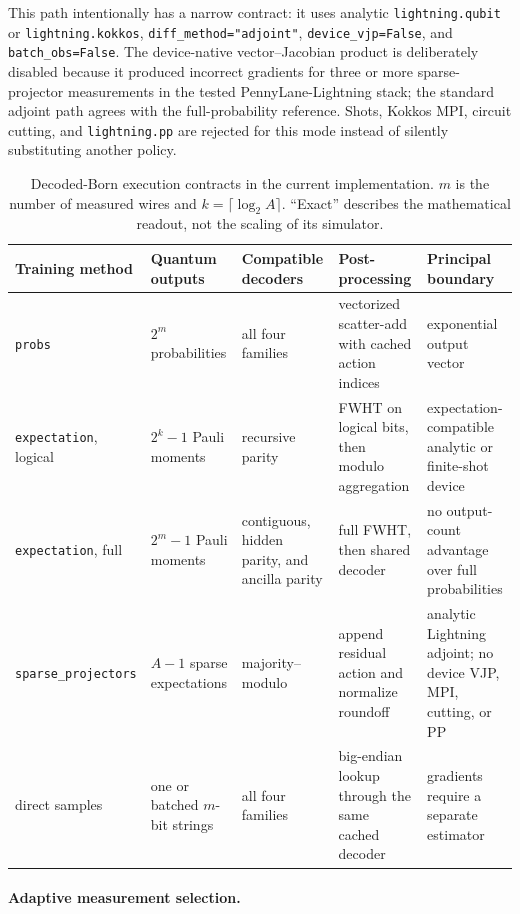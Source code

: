 \documentclass[10pt]{article}
\newcommand{\code}[1]{\texttt{#1}}
\begin{document}
This path intentionally has a narrow contract: it uses analytic
\code{lightning.qubit} or \code{lightning.kokkos},
\code{diff\_method="adjoint"}, \code{device\_vjp=False}, and
\code{batch\_obs=False}.  The device-native vector--Jacobian product is
deliberately disabled because it produced incorrect gradients for three or
more sparse-projector measurements in the tested PennyLane-Lightning stack;
the standard adjoint path agrees with the full-probability reference.  Shots,
Kokkos MPI, circuit cutting, and \code{lightning.pp} are rejected for this
mode instead of silently substituting another policy.

\begin{table}[t]
\centering
\caption{Decoded-Born execution contracts in the current implementation.
$m$ is the number of measured wires and $k=\lceil\log_2A\rceil$.  ``Exact''
describes the mathematical readout, not the scaling of its simulator.}
\label{tab:policy-execution-contracts}
\small
\begin{tabularx}{\textwidth}{@{}p{}p{}p{}X p{}@{}}
\toprule
Training method & Quantum outputs & Compatible decoders & Post-processing & Principal boundary \\
\midrule
\code{probs} & $2^m$ probabilities & all four families & vectorized scatter-add with cached action indices & exponential output vector \\
\code{expectation}, logical & $2^k-1$ Pauli moments & recursive parity & FWHT on logical bits, then modulo aggregation & expectation-compatible analytic or finite-shot device \\
\code{expectation}, full & $2^m-1$ Pauli moments & contiguous, hidden parity, and ancilla parity & full FWHT, then shared decoder & no output-count advantage over full probabilities \\
\code{sparse\_projectors} & $A-1$ sparse expectations & majority--modulo & append residual action and normalize roundoff & analytic Lightning adjoint; no device VJP, MPI, cutting, or PP \\
direct samples & one or batched $m$-bit strings & all four families & big-endian lookup through the same cached decoder & gradients require a separate estimator \\
\bottomrule
\end{tabularx}
\end{table}

\paragraph{Adaptive measurement selection.}
\end{document}
